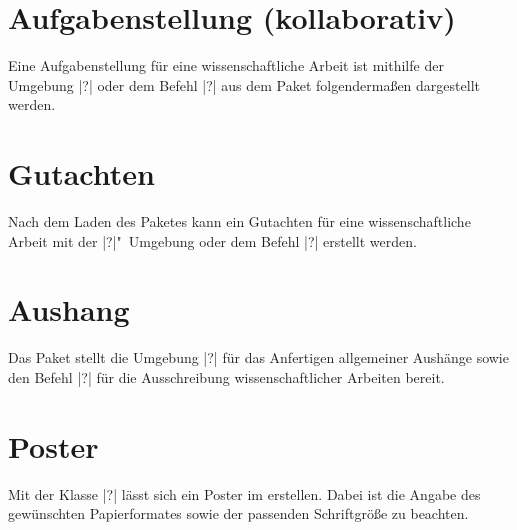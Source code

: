 \section{Aufgabenstellung (kollaborativ)}
%
%
%
%
\begin{Entity}{}
Eine Aufgabenstellung für eine wissenschaftliche Arbeit ist mithilfe der 
Umgebung |?| oder dem Befehl |?| aus dem 
Paket  folgendermaßen dargestellt werden.



\section{Gutachten}
%
%
%
Nach dem Laden des Paketes  kann ein Gutachten für 
eine wissenschaftliche Arbeit mit der |?|"~Umgebung 
oder dem Befehl |?| erstellt werden.



\section{Aushang}
%
%
%
Das Paket  stellt die Umgebung |?|
für das Anfertigen allgemeiner Aushänge sowie den Befehl |?|
für die Ausschreibung wissenschaftlicher Arbeiten bereit.
\end{Entity}



\section{Poster}
%
%
%
\begin{Entity}{}
Mit der Klasse |?| lässt sich ein Poster im \TUDCD 
erstellen. Dabei ist die Angabe des gewünschten Papierformates sowie der 
passenden Schriftgröße zu beachten.
\end{Entity}
%




